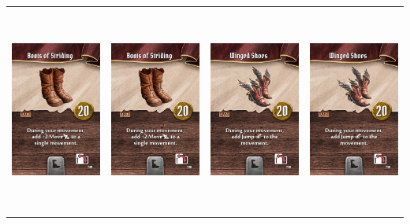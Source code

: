 \documentclass{minimal}
\begin{document}
\noindent
{\setlength{\tabcolsep}{1mm}
\begin{longtable}{llll}
\includegraphics[width=44mm,height=68mm]{./1-14/gh-001-boots-of-striding.png} &
\includegraphics[width=44mm,height=68mm]{./1-14/gh-001-boots-of-striding.png} &
\includegraphics[width=44mm,height=68mm]{./1-14/gh-002-winged-shoes.png} &
\includegraphics[width=44mm,height=68mm]{./1-14/gh-002-winged-shoes.png}\\ 

\end{longtable}}
\end{document}
